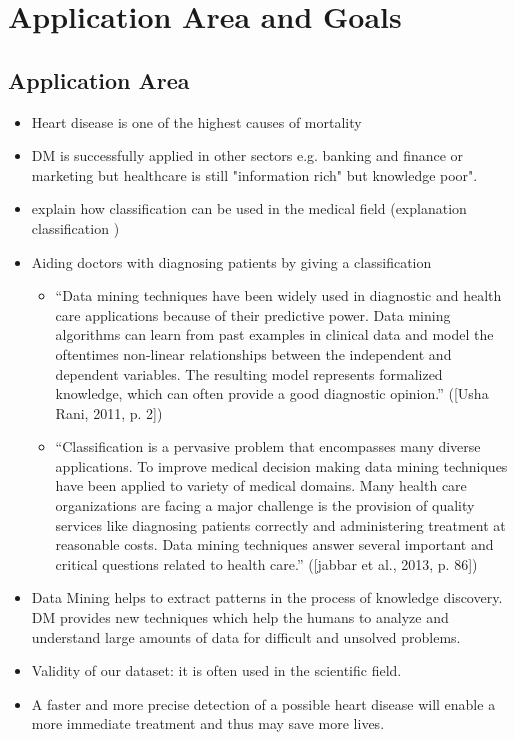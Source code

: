 \chapter{Application Area and Goals}

\section{Application Area}

\begin{itemize}
	\item Heart disease is one of the highest causes of mortality \citep{nahar2013, kavitha2016, statistischesbundesamt2020}
	\item DM is successfully applied in other sectors e.g. banking and finance or marketing \citep{keles2017} but healthcare is still "information rich" but knowledge poor". \citep{soni2011}
	\item explain how classification can be used in the medical field (explanation classification \citep{usharani2011})
	\item Aiding doctors with diagnosing patients by giving a classification
	\begin{itemize}
		\item “Data mining techniques have been widely used in diagnostic and health care applications because of their predictive power. Data mining algorithms can learn from past examples in clinical data and model the oftentimes non-linear relationships between the independent and dependent variables. The resulting model represents formalized knowledge, which can often provide a good diagnostic opinion.” ([Usha Rani, 2011, p. 2]) \citep{usharani2011}
		\item “Classification is a pervasive problem that encompasses many diverse applications. To improve medical decision making data mining techniques have been applied to variety of medical domains. Many health care organizations are facing a major challenge is the provision of quality services like diagnosing patients correctly and administering treatment at reasonable costs. Data mining techniques answer several important and critical questions related to health care.” ([jabbar et al., 2013, p. 86]) \citep{jabbar2013}
	\end{itemize}
	\item Data Mining helps to extract patterns in the process of knowledge discovery. DM provides new techniques which help the humans to analyze and understand large amounts of data for difficult and unsolved problems. \citep{usharani2011}
	\item Validity of our dataset: it is often used in the scientific field. \citep{usharani2011, aha1988, nahar2013}
	\item A faster and more precise detection of a possible heart disease will enable a more immediate treatment and thus may save more lives.
\end{itemize}


